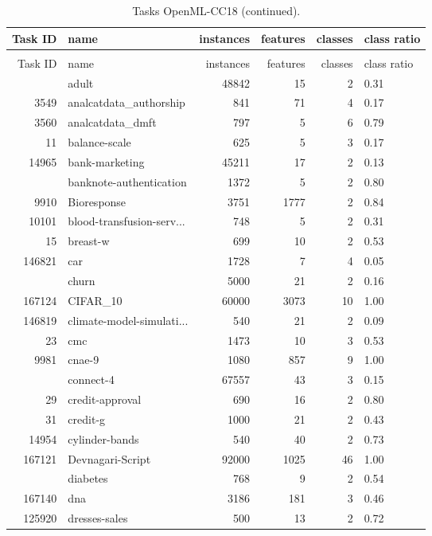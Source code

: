\begin{longtable}{rlrrrp{2em}}
\caption{Tasks OpenML-CC18.}
\label{tab:cc18}
\\
\toprule
Task ID & name & instances & features & classes & class \newline ratio \\
\midrule
\midrule
\endfirsthead
\caption*{Tasks OpenML-CC18 (continued).}\\
\toprule
Task ID & name & instances & features & classes & class \newline ratio \\
\midrule
\midrule
\endhead
\addlinespace
7592 & adult & 48842 & 15 & 2 & 0.31 \\
3549 & analcatdata\_authorship & 841 & 71 & 4 & 0.17 \\
3560 & analcatdata\_dmft & 797 & 5 & 6 & 0.79 \\
11 & balance-scale & 625 & 5 & 3 & 0.17 \\
14965 & bank-marketing & 45211 & 17 & 2 & 0.13 \\
\addlinespace
10093 & banknote-authentication & 1372 & 5 & 2 & 0.80 \\
9910 & Bioresponse & 3751 & 1777 & 2 & 0.84 \\
10101 & blood-transfusion-serv... & 748 & 5 & 2 & 0.31 \\
15 & breast-w & 699 & 10 & 2 & 0.53 \\
146821 & car & 1728 & 7 & 4 & 0.05 \\
\addlinespace
167141 & churn & 5000 & 21 & 2 & 0.16 \\
167124 & CIFAR\_10 & 60000 & 3073 & 10 & 1.00 \\
146819 & climate-model-simulati... & 540 & 21 & 2 & 0.09 \\
23 & cmc & 1473 & 10 & 3 & 0.53 \\
9981 & cnae-9 & 1080 & 857 & 9 & 1.00 \\
\addlinespace
146195 & connect-4 & 67557 & 43 & 3 & 0.15 \\
29 & credit-approval & 690 & 16 & 2 & 0.80 \\
31 & credit-g & 1000 & 21 & 2 & 0.43 \\
14954 & cylinder-bands & 540 & 40 & 2 & 0.73 \\
167121 & Devnagari-Script & 92000 & 1025 & 46 & 1.00 \\
\addlinespace
37 & diabetes & 768 & 9 & 2 & 0.54 \\
167140 & dna & 3186 & 181 & 3 & 0.46 \\
125920 & dresses-sales & 500 & 13 & 2 & 0.72 \\

\end{longtable}
